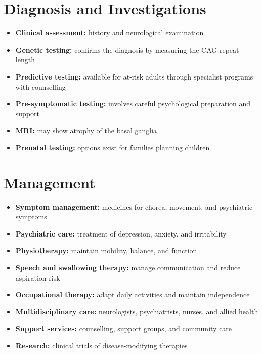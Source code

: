 \section*{Diagnosis and Investigations}
\begin{itemize}
    \item \textbf{Clinical assessment:} history and neurological examination
    \item \textbf{Genetic testing:} confirms the diagnosis by measuring the CAG repeat length
    \item \textbf{Predictive testing:} available for at-risk adults through specialist programs with counselling
    \item \textbf{Pre-symptomatic testing:} involves careful psychological preparation and support
    \item \textbf{MRI:} may show atrophy of the basal ganglia
    \item \textbf{Prenatal testing:} options exist for families planning children
\end{itemize}

\section*{Management}
\begin{itemize}
    \item \textbf{Symptom management:} medicines for chorea, movement, and psychiatric symptoms
    \item \textbf{Psychiatric care:} treatment of depression, anxiety, and irritability
    \item \textbf{Physiotherapy:} maintain mobility, balance, and function
    \item \textbf{Speech and swallowing therapy:} manage communication and reduce aspiration risk
    \item \textbf{Occupational therapy:} adapt daily activities and maintain independence
    \item \textbf{Multidisciplinary care:} neurologists, psychiatrists, nurses, and allied health
    \item \textbf{Support services:} counselling, support groups, and community care
    \item \textbf{Research:} clinical trials of disease-modifying therapies
\end{itemize}

